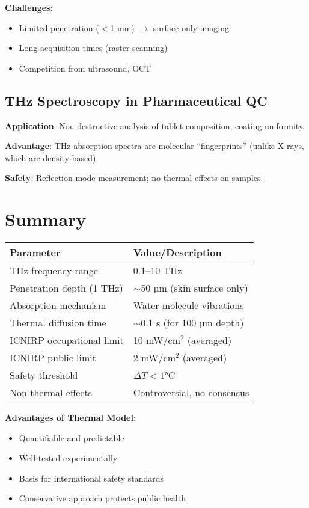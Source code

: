 \textbf{Challenges}:
\begin{itemize}
\item Limited penetration ($<$1 mm) $\rightarrow$ surface-only imaging
\item Long acquisition times (raster scanning)
\item Competition from ultrasound, OCT
\end{itemize}

\subsection{THz Spectroscopy in Pharmaceutical QC}

\textbf{Application}: Non-destructive analysis of tablet composition, coating uniformity.

\textbf{Advantage}: THz absorption spectra are molecular ``fingerprints'' (unlike X-rays, which are density-based).

\textbf{Safety}: Reflection-mode measurement; no thermal effects on samples.

\section{Summary}

\begin{center}
\begin{tabular}{ll}
\toprule
\textbf{Parameter} & \textbf{Value/Description} \\
\midrule
THz frequency range & 0.1--10 THz \\
Penetration depth (1 THz) & $\sim$50 µm (skin surface only) \\
Absorption mechanism & Water molecule vibrations \\
Thermal diffusion time & $\sim$0.1 s (for 100 µm depth) \\
ICNIRP occupational limit & 10 mW/cm$^2$ (averaged) \\
ICNIRP public limit & 2 mW/cm$^2$ (averaged) \\
Safety threshold & $\Delta T < 1°$C \\
Non-thermal effects & Controversial, no consensus \\
\bottomrule
\end{tabular}
\end{center}

\textbf{Advantages of Thermal Model}:
\begin{itemize}
\item Quantifiable and predictable
\item Well-tested experimentally
\item Basis for international safety standards
\item Conservative approach protects public health
\end{itemize}

